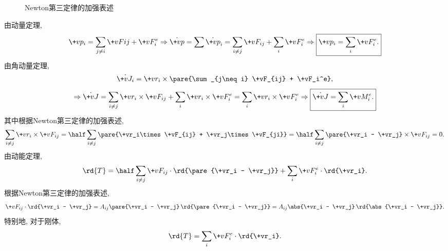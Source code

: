 \documentclass[../LectureNotes.tex]{subfiles}
\begin{document}
\begin{figure}[ht]
    \centering
    \caption{Newton第三定律的加强表述}
\end{figure}
由动量定理,
\[ \+vp_i = \sum_{j\neq i} \+vF{ij} + \+vF_i^e\Rightarrow \dot{\+vp} = \sum \dot{\+vp}_i = \sum_{i\neq j} \+vF_{ij} + \sum_i \+vF_i^e \Rightarrow \boxed{\+vp_i = \sum_i \+vF_i^e.} \]
由角动量定理,
\[ \dot{\+vJ_i} = \+vr_i\times\pare{\sum_{j\neq i} \+vF_{ij} + \+vF_i^e}, \]
\[ \Rightarrow \dot{\+vJ} = \sum_{i\neq j} \+vr_i\times\+vF_{ij} + \sum_i \+vr_i\times\+vF_i^e = \sum_i \+vr_i\times\+vF_i^e \Rightarrow \boxed{\dot{\+vJ} = \sum_i \+vM_i^e.} \]
其中根据Newton第三定律的加强表述,
\[ \sum_{i\neq j} \+vr_i\times\+vF_{ij} = \half \sum_{i\neq j} \pare{\+vr_i\times\+vF_{ij} + \+vr_j\times\+vF_{ji}}  = \half\sum_{i\neq j} \pare{\+vr_i - \+vr_j} \times\+vF_{ij} = 0. \]
由动能定理,
\[ \rd{T} = \half\sum_{i\neq j} \+vF_{ij}\cdot\rd{\pare{\+vr_i - \+vr_j}} + \sum_i \+vF_i^e\cdot\rd{\+vr_i}. \]
根据Newton第三定律的加强表述,
\[ \+vF_{ij}\cdot\rd{\+vr_i - \+vr_j} = A_{ij} \pare{\+vr_i - \+vr_j}\,\rd{\pare{\+vr_i - \+vr_j}} = A_{ij} \abs{\+vr_i - \+vr_j}\,\rd{\abs{\+vr_i - \+vr_j}}. \]
特别地, 对于刚体,
\[ \rd{T} = \sum_i \+vF_i^e \cdot\rd{\+vr_i}. \]



\end{document}

